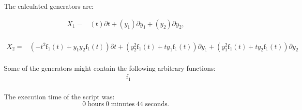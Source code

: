 \noindent The calculated generators are:

\begin{align*}
X_{1}=&\left(t \right)\partial t+\left(y_{1} \right)\partial y_{1}+\left(y_{2} \right)\partial y_{2},\\
\end{align*}

\begin{align*}
X_{2}=&\left(- t^{2} \operatorname{f_{1}}{\left(t \right)}+y_{1} y_{2} \operatorname{f_{1}}{\left(t \right)} \right)\partial t+\left(y_{2}^{2} \operatorname{f_{1}}{\left(t \right)}+t y_{1} \operatorname{f_{1}}{\left(t \right)} \right)\partial y_{1}+\left(y_{1}^{2} \operatorname{f_{1}}{\left(t \right)}+t y_{2} \operatorname{f_{1}}{\left(t \right)} \right)\partial y_{2}\\
\end{align*}



\noindent Some of the generators might contain the following arbitrary functions:
\begin{align*}
&\operatorname{f_{1}}\\
\end{align*}

\noindent The execution time of the script was:
$$0\;\mathrm{hours}\;0\;\mathrm{minutes}\;44 \;\mathrm{seconds}.$$
